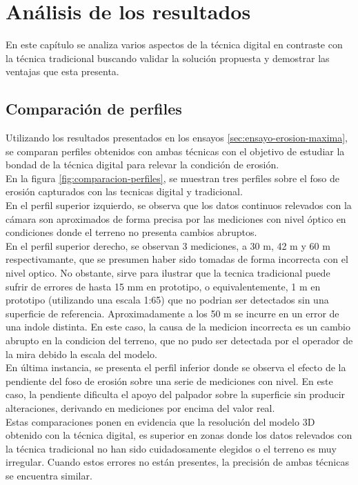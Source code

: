 \chapter{Análisis de los resultados}
En este capítulo se analiza varios aspectos de la técnica digital en contraste con la técnica tradicional buscando validar la solución propuesta y demostrar las ventajas que esta presenta.

\section{Comparación de perfiles}
Utilizando los resultados presentados en los ensayos \ref{sec:ensayo-erosion-maxima}, se comparan perfiles obtenidos con ambas técnicas con el objetivo de estudiar la bondad de la técnica digital para relevar la condición de erosión. \\
En la figura \ref{fig:comparacion-perfiles}, se muestran tres perfiles sobre el foso de erosión capturados con las tecnicas digital y tradicional. \\
En el perfil superior izquierdo, se observa que los datos continuos relevados con la cámara son aproximados de forma precisa por las mediciones con nivel óptico en condiciones donde el terreno no presenta cambios abruptos. \\
En el perfil superior derecho, se observan 3 mediciones, a 30 m, 42 m y 60 m respectivamante, que se presumen haber sido tomadas de forma incorrecta con el nivel optico. No obstante, sirve para ilustrar que la tecnica tradicional puede sufrir de errores de hasta 15 mm en prototipo, o equivalentemente, 1 m en prototipo (utilizando una escala 1:65) que no podrian ser detectados sin una superficie de referencia. Aproximadamente a los 50 m se incurre en un error de una indole distinta. En este caso, la causa de la medicion incorrecta es un cambio abrupto en la condicion del terreno, que no pudo ser detectada por el operador de la mira debido la escala del modelo. \\ 
En última instancia, se presenta el perfil inferior donde se observa el efecto de la pendiente del foso de erosión sobre una serie de mediciones con nivel. En este caso, la pendiente dificulta el apoyo del palpador sobre la superficie sin producir alteraciones, derivando en mediciones por encima del valor real. \\
Estas comparaciones ponen en evidencia que la resolución del modelo 3D obtenido con la técnica digital, es superior en zonas donde los datos relevados con la técnica tradicional no han sido cuidadosamente elegidos o el terreno es muy irregular. Cuando estos errores no están presentes, la precisión de ambas técnicas se encuentra similar.

